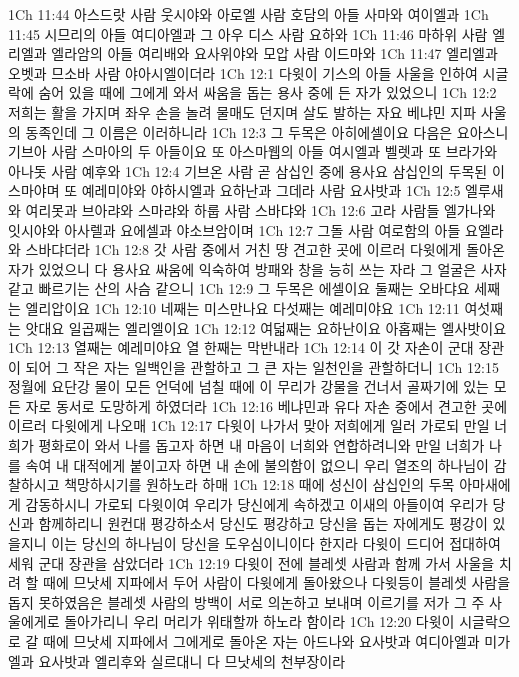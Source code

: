 1Ch 11:44  아스드랏 사람 웃시야와 아로엘 사람 호담의 아들 사마와 여이엘과
1Ch 11:45  시므리의 아들 여디아엘과 그 아우 디스 사람 요하와
1Ch 11:46  마하위 사람 엘리엘과 엘라암의 아들 여리배와 요사위야와 모압 사람 이드마와
1Ch 11:47  엘리엘과 오벳과 므소바 사람 야아시엘이더라
1Ch 12:1  다윗이 기스의 아들 사울을 인하여 시글락에 숨어 있을 때에 그에게 와서 싸움을 돕는 용사 중에 든 자가 있었으니
1Ch 12:2  저희는 활을 가지며 좌우 손을 놀려 물매도 던지며 살도 발하는 자요 베냐민 지파 사울의 동족인데 그 이름은 이러하니라
1Ch 12:3  그 두목은 아히에셀이요 다음은 요아스니 기브아 사람 스마아의 두 아들이요 또 아스마웹의 아들 여시엘과 벨렛과 또 브라가와 아나돗 사람 예후와
1Ch 12:4  기브온 사람 곧 삼십인 중에 용사요 삼십인의 두목된 이스마야며 또 예레미야와 야하시엘과 요하난과 그데라 사람 요사밧과
1Ch 12:5  엘루새와 여리못과 브아랴와 스마랴와 하룹 사람 스바댜와
1Ch 12:6  고라 사람들 엘가나와 잇시야와 아사렐과 요에셀과 야소브암이며
1Ch 12:7  그돌 사람 여로함의 아들 요엘라와 스바댜더라
1Ch 12:8  갓 사람 중에서 거친 땅 견고한 곳에 이르러 다윗에게 돌아온 자가 있었으니 다 용사요 싸움에 익숙하여 방패와 창을 능히 쓰는 자라 그 얼굴은 사자 같고 빠르기는 산의 사슴 같으니
1Ch 12:9  그 두목은 에셀이요 둘째는 오바댜요 세째는 엘리압이요
1Ch 12:10  네째는 미스만나요 다섯째는 예레미야요
1Ch 12:11  여섯째는 앗대요 일곱째는 엘리엘이요
1Ch 12:12  여덟째는 요하난이요 아홉째는 엘사밧이요
1Ch 12:13  열째는 예레미야요 열 한째는 막반내라
1Ch 12:14  이 갓 자손이 군대 장관이 되어 그 작은 자는 일백인을 관할하고 그 큰 자는 일천인을 관할하더니
1Ch 12:15  정월에 요단강 물이 모든 언덕에 넘칠 때에 이 무리가 강물을 건너서 골짜기에 있는 모든 자로 동서로 도망하게 하였더라
1Ch 12:16  베냐민과 유다 자손 중에서 견고한 곳에 이르러 다윗에게 나오매
1Ch 12:17  다윗이 나가서 맞아 저희에게 일러 가로되 만일 너희가 평화로이 와서 나를 돕고자 하면 내 마음이 너희와 연합하려니와 만일 너희가 나를 속여 내 대적에게 붙이고자 하면 내 손에 불의함이 없으니 우리 열조의 하나님이 감찰하시고 책망하시기를 원하노라 하매
1Ch 12:18  때에 성신이 삼십인의 두목 아마새에게 감동하시니 가로되 다윗이여 우리가 당신에게 속하겠고 이새의 아들이여 우리가 당신과 함께하리니 원컨대 평강하소서 당신도 평강하고 당신을 돕는 자에게도 평강이 있을지니 이는 당신의 하나님이 당신을 도우심이니이다 한지라 다윗이 드디어 접대하여 세워 군대 장관을 삼았더라
1Ch 12:19  다윗이 전에 블레셋 사람과 함께 가서 사울을 치려 할 때에 므낫세 지파에서 두어 사람이 다윗에게 돌아왔으나 다윗등이 블레셋 사람을 돕지 못하였음은 블레셋 사람의 방백이 서로 의논하고 보내며 이르기를 저가 그 주 사울에게로 돌아가리니 우리 머리가 위태할까 하노라 함이라
1Ch 12:20  다윗이 시글락으로 갈 때에 므낫세 지파에서 그에게로 돌아온 자는 아드나와 요사밧과 여디아엘과 미가엘과 요사밧과 엘리후와 실르대니 다 므낫세의 천부장이라
